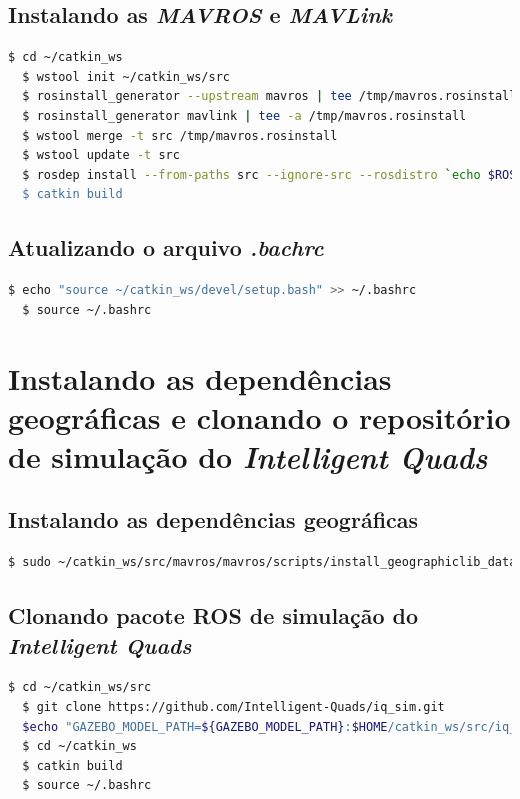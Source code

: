 \documentclass[12pt,a4paper,oneside]{book}
\begin{document}
\subsection{Instalando as \textit{MAVROS} e \textit{MAVLink}}
\begin{lstlisting}[language=bash] 
  $ cd ~/catkin_ws
  $ wstool init ~/catkin_ws/src
  $ rosinstall_generator --upstream mavros | tee /tmp/mavros.rosinstall
  $ rosinstall_generator mavlink | tee -a /tmp/mavros.rosinstall
  $ wstool merge -t src /tmp/mavros.rosinstall
  $ wstool update -t src
  $ rosdep install --from-paths src --ignore-src --rosdistro `echo $ROS_DISTRO' -y
  $ catkin build
\end{lstlisting}

\subsection{Atualizando o arquivo \textit{.bachrc}}
\begin{lstlisting}[language=bash] 
  $ echo "source ~/catkin_ws/devel/setup.bash" >> ~/.bashrc
  $ source ~/.bashrc
\end{lstlisting}

\section{Instalando as dependências geográficas e clonando o repositório de simulação do \textit{Intelligent Quads}}

\subsection{Instalando as dependências geográficas}
\begin{lstlisting}[language=bash] 
  $ sudo ~/catkin_ws/src/mavros/mavros/scripts/install_geographiclib_datasets.sh]
\end{lstlisting}

\subsection{Clonando pacote ROS de simulação do \textit{Intelligent Quads}}
\begin{lstlisting}[language=bash] 
  $ cd ~/catkin_ws/src
  $ git clone https://github.com/Intelligent-Quads/iq_sim.git
  $echo "GAZEBO_MODEL_PATH=${GAZEBO_MODEL_PATH}:$HOME/catkin_ws/src/iq_sim/models" >> ~/.bashrc
  $ cd ~/catkin_ws
  $ catkin build
  $ source ~/.bashrc
\end{lstlisting}
\end{document}
